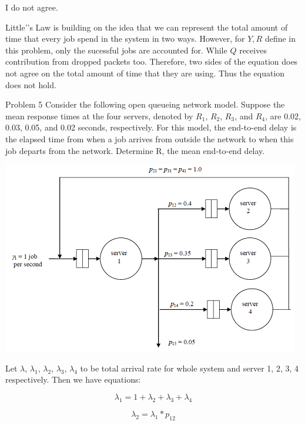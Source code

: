 \documentclass[12pt]{article}
\begin{document}
\begin{enumerate}
I do not agree.

Little'’s Law is building on the idea that we can represent the total amount of time that every job spend in the system in two ways. However, for $Y, R$ define in this problem, only the sucessful jobs are accounted for. While $Q$ receives contribution from dropped packets too. Therefore, two sides of the equation does not agree on the total amount of time that they are using. Thus the equation does not hold.
\medskip

\begin{minipage}{\textwidth}
\item{Problem 5}
Consider the following open queueing network model. Suppose the mean response times at the four servers, denoted by $R_1$, $R_2$, $R_3$, and $R_4$, are 0.02, 0.03, 0.05, and 0.02 seconds, respectively. For this model, the end-to-end delay is the elapsed time from when a job arrives from outside the network to when this job departs from the network. Determine R, the mean end-to-end delay.

\includegraphics[width=\textwidth]{a1q5.png}
\end{minipage}

Let $\lambda$, $\lambda_1$, $\lambda_2$, $\lambda_3$, $\lambda_4$ to be total arrival rate for whole system and server 1, 2, 3, 4 respectively. Then we have equations:

\begin{equation}
\lambda_1 = 1 + \lambda_2 + \lambda_3 + \lambda_4
\end{equation}

\begin{equation}
\lambda_2 = \lambda_1 * p_{12}
\end{equation}


\end{enumerate}
\end{document}
